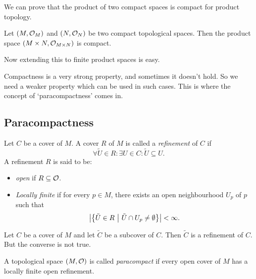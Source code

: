 \noindent We can prove that the product of two compact spaces is compact for product topology.
\begin{theorem}
	Let \((M, \mathcal{O}_M)\) and \((N, \mathcal{O}_N)\) be two compact topological spaces. Then the product space \((M \times N, \mathcal{O}_{M \times N})\) is compact.
\end{theorem}
Now extending this to finite product spaces is easy.

Compactness is a very strong property, and sometimes it doesn't hold. So we need a weaker property which can be used in such cases. This is where the concept of `paracompactness' comes in.

\subsection{Paracompactness}

\begin{definition}\label{def:refinement_cover}
	Let \(C\) be a cover of \(M\). A cover \(R\) of \(M\) is called a \emph{refinement} of \(C\) if
	\begin{equation}
		\forall \tilde{U} \in R: \exists U \in C: \tilde{U} \subseteq U. \label{eq:refinement_cover}
	\end{equation}
	A refinement \(R\) is said to be:
	\begin{itemize}
		\item \emph{open} if \(R \subseteq \mathcal{O}\).
		\item \emph{Locally finite} if for every \(p \in M\), there exists an open neighbourhood \(U_p\) of \(p\) such that
		      \begin{equation}
			      \abs{\qty{\tilde{U} \in R \ \middle|\ \tilde{U} \cap U_p \neq \emptyset}} < \infty. \label{eq:locally_finite_cover}
		      \end{equation}
	\end{itemize}
\end{definition}

\begin{remark}
	Let \(C\) be a cover of \(M\) and let \(\tilde{C}\) be a subcover of \(C\). Then \(\tilde{C}\) is a refinement of \(C\). But the converse is not true.
\end{remark}

\begin{definition}\label{def:paracompact_space}
	A topological space \((M, \mathcal{O})\) is called \emph{paracompact} if every open cover of \(M\) has a locally finite open refinement.
\end{definition}

